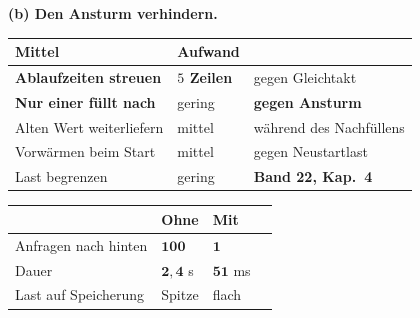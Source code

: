 \begin{aufgabe}
\begin{center}
\end{center}

\medskip
\textbf{(b) Den Ansturm verhindern.}

\begin{center}
{\small
\renewcommand{\arraystretch}{1.5}
\begin{tabular}{@{}P{3.0cm}P{2.2cm}P{2.6cm}@{}}
\toprule
\textbf{Mittel} & \textbf{Aufwand} & \\
\midrule
\textbf{Ablaufzeiten streuen} & \textcolor{gruen}{\textbf{$5$ Zeilen}} & \textcolor{gruen}{gegen Gleichtakt}\\
\textbf{Nur einer füllt nach} & \textcolor{gruen}{gering} & \textcolor{gruen}{\textbf{gegen Ansturm}}\\
Alten Wert weiterliefern & mittel & \textcolor{gruen}{während des Nachfüllens}\\
Vorwärmen beim Start & mittel & \textcolor{gruen}{gegen Neustartlast}\\
Last begrenzen & gering & \textbf{Band 22, Kap.~4}\\
\bottomrule
\end{tabular}}
\end{center}

\begin{center}
\begin{minipage}{0.88\textwidth}
\end{minipage}
\end{center}

\begin{center}
\renewcommand{\arraystretch}{1.45}
\begin{tabular}{@{}P{2.8cm}P{2.2cm}P{2.4cm}P{1.8cm}@{}}
\toprule
& \textbf{Ohne} & \textbf{Mit} & \\
\midrule
Anfragen nach hinten & $\mathbf{100}$ & $\mathbf{1}$ & \\
Dauer & $\mathbf{2{,}4}$ s & $\mathbf{51}$ ms & \\
Last auf Speicherung & \textcolor{akzent}{Spitze} & \textcolor{gruen}{flach} & \\
\bottomrule
\end{tabular}
\end{center}


\end{aufgabe}
